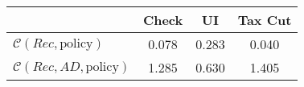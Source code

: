 \begin{tabular}{@{}lccc@{}} 
\toprule 
                          & Check      & UI    & Tax Cut    \\  \midrule 
$\mathcal{C}(Rec,\text{policy})$ & 0.078  & 0.283  & 0.040     \\ 
$\mathcal{C}(Rec, AD,\text{policy})$ & 1.285  & 0.630  & 1.405     \\ 
\end{tabular}  
